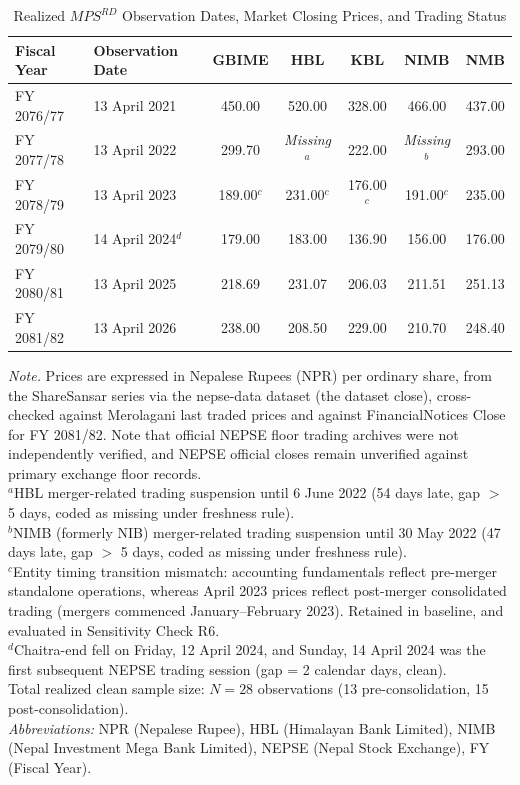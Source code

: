 \begin{table}[!ht]
\centering
\small
\caption{Realized $\mathit{MPS}^{RD}$ Observation Dates, Market Closing Prices, and Trading Status}
\label{tab:mps_rd}
\begin{tabular}{llccccc}
\toprule
\textbf{Fiscal Year} & \textbf{Observation Date} & \textbf{GBIME} & \textbf{HBL} & \textbf{KBL} & \textbf{NIMB} & \textbf{NMB} \\
\midrule
FY 2076/77 & 13 April 2021 & 450.00 & 520.00 & 328.00 & 466.00 & 437.00 \\
FY 2077/78 & 13 April 2022 & 299.70 & \textit{Missing}$^a$ & 222.00 & \textit{Missing}$^b$ & 293.00 \\
FY 2078/79 & 13 April 2023 & 189.00$^c$ & 231.00$^c$ & 176.00$^c$ & 191.00$^c$ & 235.00 \\
FY 2079/80 & 14 April 2024$^d$ & 179.00 & 183.00 & 136.90 & 156.00 & 176.00 \\
FY 2080/81 & 13 April 2025 & 218.69 & 231.07 & 206.03 & 211.51 & 251.13 \\
FY 2081/82 & 13 April 2026 & 238.00 & 208.50 & 229.00 & 210.70 & 248.40 \\
\bottomrule
\end{tabular}

\vspace{4pt}
\begin{minipage}{\linewidth}
\footnotesize
\textit{Note.} Prices are expressed in Nepalese Rupees (NPR) per ordinary share, from the ShareSansar series via the nepse-data dataset (the dataset close), cross-checked against Merolagani last traded prices and against FinancialNotices Close for FY 2081/82. Note that official NEPSE floor trading archives were not independently verified, and NEPSE official closes remain unverified against primary exchange floor records. \\
$^a$HBL merger-related trading suspension until 6 June 2022 (54 days late, gap $>$ 5 days, coded as missing under freshness rule). \\
$^b$NIMB (formerly NIB) merger-related trading suspension until 30 May 2022 (47 days late, gap $>$ 5 days, coded as missing under freshness rule). \\
$^c$Entity timing transition mismatch: accounting fundamentals reflect pre-merger standalone operations, whereas April 2023 prices reflect post-merger consolidated trading (mergers commenced January--February 2023). Retained in baseline, and evaluated in Sensitivity Check R6. \\
$^d$Chaitra-end fell on Friday, 12 April 2024, and Sunday, 14 April 2024 was the first subsequent NEPSE trading session (gap = 2 calendar days, clean). \\
Total realized clean sample size: $N = 28$ observations (13 pre-consolidation, 15 post-consolidation). \\
\textit{Abbreviations:} NPR (Nepalese Rupee), HBL (Himalayan Bank Limited), NIMB (Nepal Investment Mega Bank Limited), NEPSE (Nepal Stock Exchange), FY (Fiscal Year).
\end{minipage}
\end{table}

